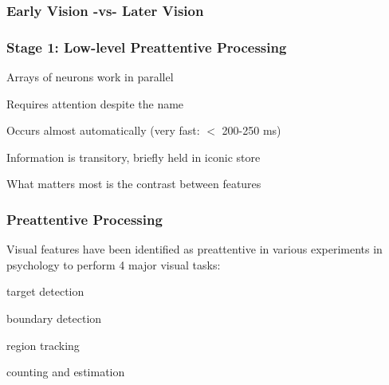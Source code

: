\documentclass[12pt]{beamer}\usepackage[]{graphicx}\usepackage[]{color}
\begin{document}

\begin{frame}
\frametitle{Early Vision -vs- Later Vision}
\begin{center}
\end{center}
\end{frame}


\begin{frame}
\begin{center}
\Huge{}
\end{center}
\end{frame}


\begin{frame}
\frametitle{Stage 1: Low-level Preattentive Processing}

\bbi
  \item Arrays of neurons work in parallel
  \item Requires attention despite the name
  \item Occurs almost automatically (very fast: $<$ 200-250 ms)
  \item Information is transitory, briefly held in iconic store
  \item What matters most is the contrast between features
\ei

\end{frame}


\begin{frame}
\frametitle{Preattentive Processing}

Visual features have been identified as preattentive in 
various experiments in psychology to perform 4 major visual tasks:
\bi
  \item target detection
  \item boundary detection
  \item region tracking
  \item counting and estimation
\ei
\eb

\end{frame}

\end{document}
